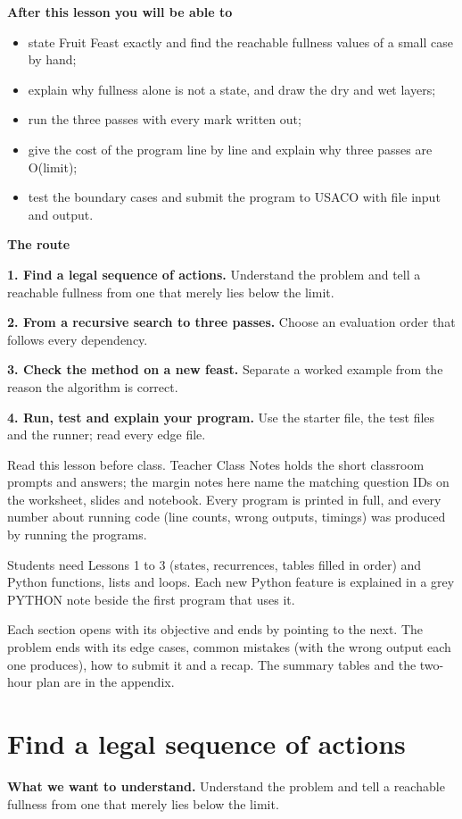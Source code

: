 \documentclass[11pt,a4paper,oneside]{report}
\newcommand{\readinggoal}[1]{\par\textbf{What we want to understand.} #1\par\smallskip}
\begin{document}
\textbf{After this lesson you will be able to}\begin{itemize}\item state Fruit Feast exactly and find the reachable fullness values of a small case by hand;\item explain why fullness alone is not a state, and draw the dry and wet layers;\item run the three passes with every mark written out;\item give the cost of the program line by line and explain why three passes are O(limit);\item test the boundary cases and submit the program to USACO with file input and output.\end{itemize}
\textbf{The route}\par
\textbf{1. Find a legal sequence of actions.} Understand the problem and tell a reachable fullness from one that merely lies below the limit.\par
\textbf{2. From a recursive search to three passes.} Choose an evaluation order that follows every dependency.\par
\textbf{3. Check the method on a new feast.} Separate a worked example from the reason the algorithm is correct.\par
\textbf{4. Run, test and explain your program.} Use the starter file, the test files and the runner; read every edge file.\par
Read this lesson before class. Teacher Class Notes holds the short classroom prompts and answers; the margin notes here name the matching question IDs on the worksheet, slides and notebook. Every program is printed in full, and every number about running code (line counts, wrong outputs, timings) was produced by running the programs.

Students need Lessons 1 to 3 (states, recurrences, tables filled in order) and Python functions, lists and loops. Each new Python feature is explained in a grey PYTHON note beside the first program that uses it.

Each section opens with its objective and ends by pointing to the next. The problem ends with its edge cases, common mistakes (with the wrong output each one produces), how to submit it and a recap. The summary tables and the two-hour plan are in the appendix.


\chapter{Find a legal sequence of actions}
\readinggoal{Understand the problem and tell a reachable fullness from one that merely lies below the limit.}
\end{document}
